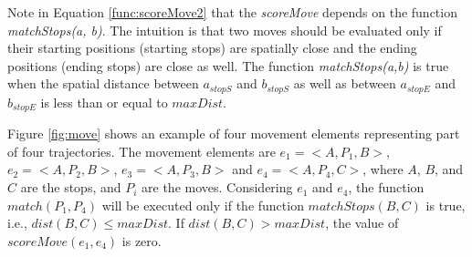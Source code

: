 \documentclass[12pt]{article}
\begin{document}
Note in Equation \ref{func:scoreMove2} that the \emph{scoreMove} depends on the function \textit{matchStops(a, b)}. {The intuition is that two moves should be evaluated only if their starting positions (starting stops) are spatially close and the ending positions (ending stops) are close as well.}
The function \emph{matchStops(a,b)} is true when the {spatial distance} between $a_{stopS}$ and $b_{stopS}$  as well as between $a_{stopE}$ and $b_{stopE}$ is less than or equal to $maxDist$.
    

{Figure {\ref{fig:move}} shows an example of four movement elements representing part of four trajectories. The movement elements are $e_1=<A, P_1, B>$, $e_2=<A, P_2, B>$, $e_3=<A, P_3, B>$ and $e_4=<A, P_4, C>$, where $A$, $B$, and $C$ are the stops, and $P_i$ are the moves. Considering $e_1$ and $e_4$, the function $match(P_1,P_4)$ will be executed only if the function $matchStops(B,C)$ is true, i.e., $dist(B,C) \leq  maxDist$. If $dist(B,C) > maxDist$, the value of $scoreMove(e_1,e_4)$ is zero.
}


\end{document}

